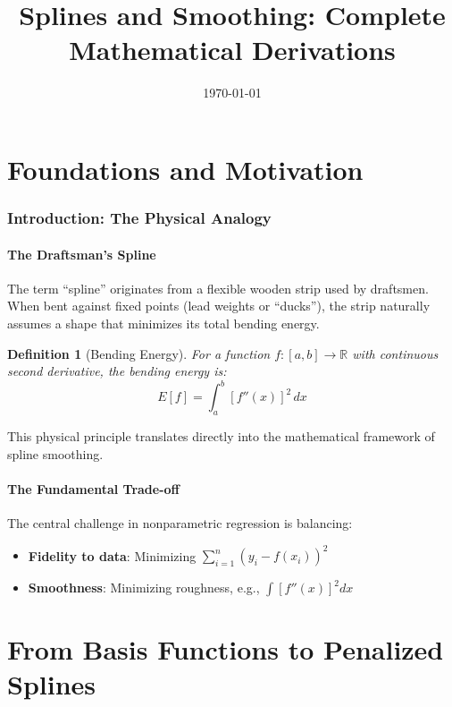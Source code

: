 \documentclass[12pt]{article}
\title{Splines and Smoothing: Complete Mathematical Derivations}
\author{}
\date{\today}
\newtheorem{definition}{Definition}
\newcommand{\R}{\mathbb{R}}
\begin{document}
\maketitle
\tableofcontents
\newpage

\part{Foundations and Motivation}

\section{Introduction: The Physical Analogy}

\subsection{The Draftsman's Spline}

The term ``spline'' originates from a flexible wooden strip used by draftsmen. When bent against fixed points (lead weights or ``ducks''), the strip naturally assumes a shape that minimizes its total bending energy.

\begin{definition}[Bending Energy]
For a function $f: [a,b] \to \R$ with continuous second derivative, the bending energy is:
\begin{equation}
E[f] = \int_a^b [f''(x)]^2 \, dx
\end{equation}
\end{definition}

This physical principle translates directly into the mathematical framework of spline smoothing.

\subsection{The Fundamental Trade-off}

The central challenge in nonparametric regression is balancing:
\begin{itemize}
    \item \textbf{Fidelity to data}: Minimizing $\sum_{i=1}^n (y_i - f(x_i))^2$
    \item \textbf{Smoothness}: Minimizing roughness, e.g., $\int [f''(x)]^2 dx$
\end{itemize}

\part{From Basis Functions to Penalized Splines}
\end{document}
